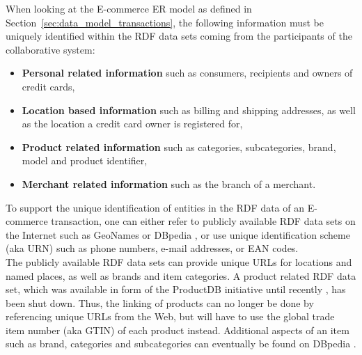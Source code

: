 When looking at the \gls{E-commerce} \gls{ER} model as defined in Section~\ref{sec:data_model_transactions}, the following information must be uniquely identified within the \gls{RDF} data sets coming from the participants of the collaborative system: \@

\begin{itemize}
	\item \textbf{Personal related information} such as consumers, recipients and owners of credit cards,
	\item \textbf{Location based information} such as billing and shipping addresses, as well as the location a credit card owner is registered for,
	\item \textbf{Product related information} such as categories, subcategories, brand, model and product identifier,
	\item \textbf{Merchant related information} such as the branch of a merchant.
\end{itemize}

To support the unique identification of entities in the \gls{RDF} data of an \gls{E-commerce} transaction, one can either refer to publicly available \gls{RDF} data sets on the Internet such as GeoNames \citep{geonames} or DBpedia \citep{dbPedia.org}, or use unique identification scheme (aka \gls{URN}) such as phone numbers, e-mail addresses, or \gls{EAN} codes. \\

The publicly available \gls{RDF} data sets can provide unique \gls{URL}s for locations and named places, as well as brands and item categories. A product related \gls{RDF} data set, which was available in form of the ProductDB initiative until recently \citep{bouzidi2014product}, has been shut down. Thus, the linking of products can no longer be done by referencing unique \gls{URL}s from the Web, but will have to use the global trade item number (aka \gls{GTIN}) of each product instead. Additional aspects of an item such as brand, categories and subcategories can eventually be found on DBpedia \citep{dbPedia.org}. \\

